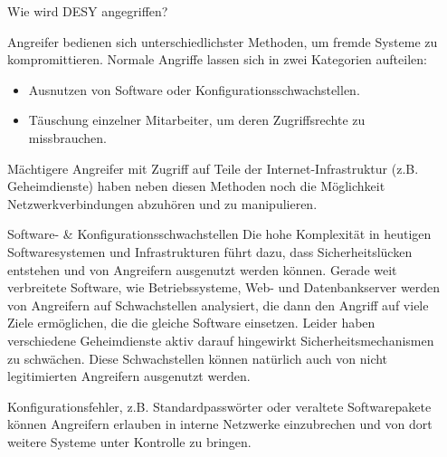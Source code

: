 \documentclass[final]{beamer}
\newlength{\sepwid}
\newlength{\twocolwid}
\begin{document}
\begin{frame}[t]
\begin{columns}[t, totalwidth=\textwidth]
\begin{column}{\twocolwid}
\begin{column}{\sepwid}\end{column} %


\begin{block}{Wie wird DESY angegriffen?}

Angreifer bedienen sich unterschiedlichster Methoden, um fremde Systeme zu 
kompromittieren. Normale Angriffe lassen sich in zwei Kategorien aufteilen:

\begin{itemize}
 \item Ausnutzen von Software oder Konfigurationsschwachstellen.
 \item Täuschung einzelner Mitarbeiter, um deren Zugriffsrechte zu missbrauchen.
\end{itemize}

Mächtigere Angreifer mit Zugriff auf Teile der Internet-Infrastruktur 
(z.B. Geheimdienste) haben neben diesen Methoden noch die Möglichkeit 
Netzwerkverbindungen abzuhören und zu manipulieren.

\end{block}

\begin{block}{Software- \& Konfigurationsschwachstellen}
 Die hohe Komplexität in heutigen Softwaresystemen und Infrastrukturen führt dazu, dass
 Sicherheitslücken entstehen und von Angreifern ausgenutzt werden können. 
 Gerade weit verbreitete Software, wie Betriebssysteme, Web- und Datenbankserver werden 
 von Angreifern auf Schwachstellen analysiert, die dann den Angriff auf viele Ziele ermöglichen, 
 die die gleiche Software einsetzen. Leider haben verschiedene Geheimdienste aktiv darauf 
 hingewirkt Sicherheitsmechanismen zu schwächen. Diese Schwachstellen können natürlich auch 
 von nicht legitimierten Angreifern ausgenutzt werden.
 \par
 Konfigurationsfehler, z.B. Standardpasswörter oder veraltete Softwarepakete können
 Angreifern erlauben in interne Netzwerke einzubrechen und von dort weitere Systeme 
 unter Kontrolle zu bringen.
\end{block}


\end{column} %

\begin{column}{\sepwid}\end{column} %


\end{columns}
\end{frame}
\end{document}
